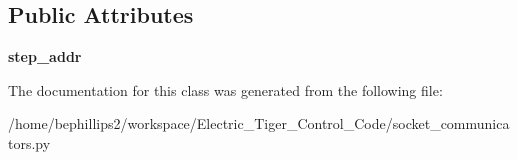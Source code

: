\subsection*{Public Attributes}
\begin{DoxyCompactItemize}
\item 
\hypertarget{classsocket__communicators_1_1_stepper_motor_comm_a29f17ad6d70339459a26e3a1dcd3ed74}{{\bfseries step\-\_\-addr}}\label{classsocket__communicators_1_1_stepper_motor_comm_a29f17ad6d70339459a26e3a1dcd3ed74}

\end{DoxyCompactItemize}


The documentation for this class was generated from the following file\-:\begin{DoxyCompactItemize}
\item 
/home/bephillips2/workspace/\-Electric\-\_\-\-Tiger\-\_\-\-Control\-\_\-\-Code/socket\-\_\-communicators.\-py\end{DoxyCompactItemize}
